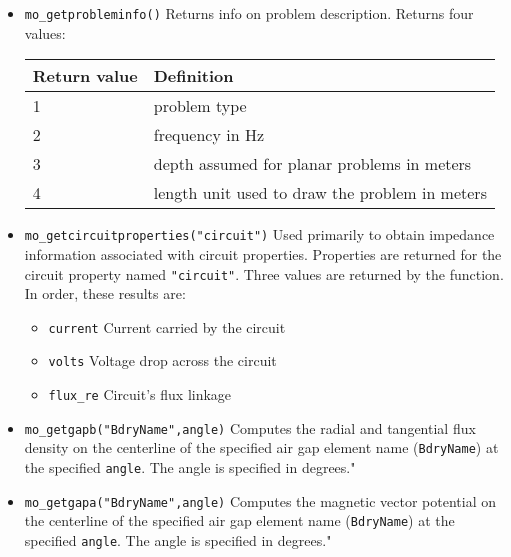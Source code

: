 \begin{itemize}
To write data instead of a plot to disk, the command would
be of the form:

\begin{tabular}{l} \verb+mo_makeplot(2,200,"c:\\temp\myfile.txt",0)+ \end{tabular}

\item \verb+mo_getprobleminfo()+
Returns info on problem description.  Returns four values:
\begin{center}
\begin{tabular}{ll} \hline
Return value & Definition \\ \hline 
1 &  problem type  \\ 
2 &  frequency in Hz \\ 
3 &  depth assumed for planar problems in meters \\
4 &  length unit used to draw the problem in meters
\end{tabular}
\end{center}

\item{\verb+mo_getcircuitproperties("circuit")+}
Used primarily to obtain impedance information associated with
circuit properties.  Properties are returned for the circuit
property named {\tt "circuit"}. Three values are returned by the
function.  In order, these results are:
\begin{itemize}
        \item{\verb+current+} Current carried by the circuit
        \item{\verb+volts+}  Voltage drop across the circuit
        \item{\verb+flux_re+} Circuit's flux linkage
        \end{itemize}




\item{\verb+mo_getgapb("BdryName",angle)+}
Computes the radial and tangential flux density on the centerline of the
specified air gap element name (\verb+BdryName+) at the specified \verb+angle+.  The angle is specified in degrees."

\item{\verb+mo_getgapa("BdryName",angle)+}
Computes the magnetic vector potential on the centerline of the
specified air gap element name (\verb+BdryName+) at the specified \verb+angle+.  The angle is specified in degrees."


\end{itemize}
